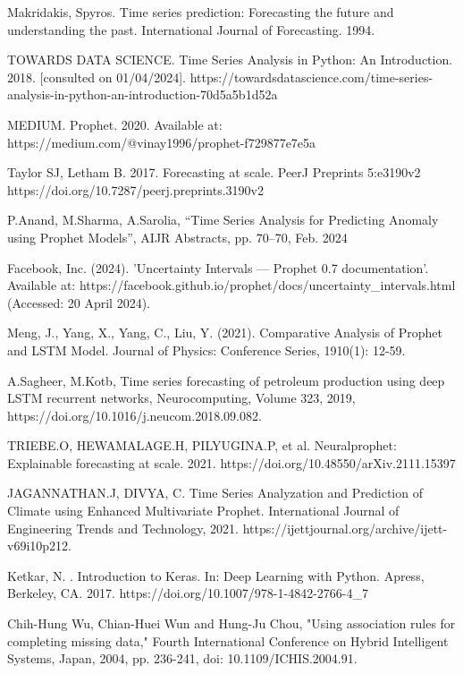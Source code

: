 \documentclass[10pt]{article}
\begin{document}
\begin{multicols}{2}

\begin{thebibliography}{2}
{\tiny
{}
Makridakis, Spyros. Time series prediction: Forecasting the future and understanding the past. International Journal of Forecasting. 1994.

TOWARDS DATA SCIENCE. Time Series Analysis in Python: An Introduction. 2018. [consulted on 01/04/2024]. https://towardsdatascience.com/time-series-analysis-in-python-an-introduction-70d5a5b1d52a

MEDIUM. Prophet. 2020. Available at: https://medium.com/@vinay1996/prophet-f729877e7e5a

Taylor SJ, Letham B. 2017. Forecasting at scale. PeerJ Preprints 5:e3190v2 https://doi.org/10.7287/peerj.preprints.3190v2

P.Anand, M.Sharma, A.Sarolia, “Time Series Analysis for Predicting Anomaly using Prophet Models”, AIJR Abstracts, pp. 70–70, Feb. 2024

Facebook, Inc. (2024). 'Uncertainty Intervals — Prophet 0.7 documentation'. Available at: https://facebook.github.io/prophet/docs/uncertainty\_intervals.html (Accessed: 20 April 2024).

Meng, J., Yang, X., Yang, C., Liu, Y. (2021). Comparative Analysis of Prophet and LSTM Model. Journal of Physics: Conference Series, 1910(1): 12-59.


A.Sagheer, M.Kotb, Time series forecasting of petroleum production using deep LSTM recurrent networks, Neurocomputing, Volume 323, 2019, https://doi.org/10.1016/j.neucom.2018.09.082.


TRIEBE.O, HEWAMALAGE.H, PILYUGINA.P, et al. Neuralprophet: Explainable forecasting at scale. 2021. https://doi.org/10.48550/arXiv.2111.15397

JAGANNATHAN.J, DIVYA, C. Time Series Analyzation and Prediction of Climate using Enhanced Multivariate Prophet. International Journal of Engineering Trends and Technology, 2021.
https://ijettjournal.org/archive/ijett-v69i10p212.

Ketkar, N. . Introduction to Keras. In: Deep Learning with Python. Apress, Berkeley, CA. 2017. https://doi.org/10.1007/978-1-4842-2766-4\_7

Chih-Hung Wu, Chian-Huei Wun and Hung-Ju Chou, "Using association rules for completing missing data," Fourth International Conference on Hybrid Intelligent Systems, Japan, 2004, pp. 236-241, doi: 10.1109/ICHIS.2004.91.
}


\end{thebibliography}
\end{multicols}
\end{document}
